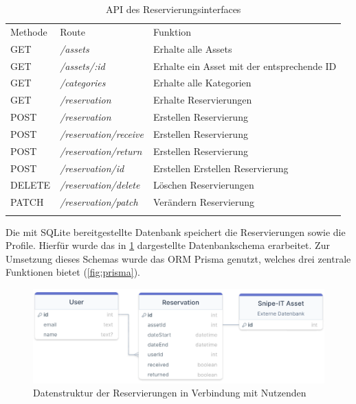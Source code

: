 \begin{table}[h]
  \centering
  \caption{API des Reservierungsinterfaces}
  \begin{tabular}{lll}
    \arrayrulecolor{maincolor}\hline
    \sffamily\color{maincolor}Methode & \sffamily\color{maincolor}Route &
    \sffamily\color{maincolor}Funktion                                                              \\
    \arrayrulecolor{maincolor}\hline
    GET                               & \textit{/assets}                & Erhalte alle Assets       \\
    GET                               & \textit{/assets/:id}            & Erhalte ein Asset mit der
    entsprechende ID                                                                                \\
    GET                               & \textit{/categories}            & Erhalte alle Kategorien   \\
    GET                               & \textit{/reservation}           & Erhalte Reservierungen    \\
    POST                              & \textit{/reservation}           & Erstellen Reservierung    \\
    POST                              & \textit{/reservation/receive}   & Erstellen Reservierung    \\
    POST                              & \textit{/reservation/return}    & Erstellen Reservierung    \\
    POST                              & \textit{/reservation/id}        & Erstellen Erstellen
    Reservierung                                                                                    \\
    DELETE                            & \textit{/reservation/delete}    & Löschen Reservierungen    \\
    PATCH                             & \textit{/reservation/patch}     & Verändern Reservierung    \\
    \arrayrulecolor{maincolor}\hline
  \end{tabular}
  \label{table:impl-backend-routes}
\end{table}

\newpage
Die mit SQLite bereitgestellte Datenbank speichert die Reservierungen sowie die
Profile. Hierfür wurde das in \ref{fig:orm} dargestellte Datenbankschema
erarbeitet. Zur Umsetzung dieses Schemas wurde das ORM Prisma genutzt, welches
drei zentrale Funktionen bietet (\ref{fig:prisma}).
\begin{figure}[h]
  \centering
  \includegraphics[scale=0.33]{Bilder/Code/UML_DB.png}
  \caption{Datenstruktur der Reservierungen in Verbindung mit Nutzenden}
  \label{fig:orm}
\end{figure}

